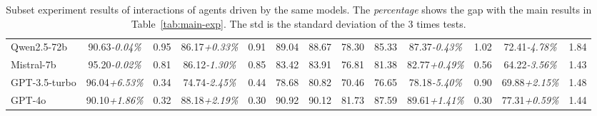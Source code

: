 \begin{table}
{\begin{tabular}{@{}lcccccccccccc@{}}
        Qwen2.5-72b & 90.63\textit{\small-0.04\%} & 0.95 & 86.17\textit{\small+0.33\%} & 0.91 & 89.04 & 88.67 & 78.30 & 85.33 & 87.37\textit{\small-0.43\%} & 1.02 & 72.41\textit{\small-4.78\%} & 1.84 \\
        Mistral-7b & 95.20\textit{\small-0.02\%} & 0.81 & 86.12\textit{\small-1.30\%} & 0.85 & 83.42 & 83.91 & 76.81 & 81.38 & 82.77\textit{\small+0.49\%} & 0.56 & 64.22\textit{\small-3.56\%} & 1.43 \\
        GPT-3.5-turbo & 96.04\textit{\small+6.53\%} & 0.34 & 74.74\textit{\small-2.45\%} & 0.44 & 78.68 & 80.82 & 70.46 & 76.65 & 78.18\textit{\small-5.40\%} & 0.90 & 69.88\textit{\small+2.15\%} & 1.48 \\
        GPT-4o & 90.10\textit{\small+1.86\%} & 0.32 & 88.18\textit{\small+2.19\%} & 0.30 & 90.92 & 90.12 & 81.73 & 87.59 & 89.61\textit{\small+1.41\%} & 0.30 & 77.31\textit{\small+0.59\%} & 1.44 \\ \bottomrule[1.1pt]
    \end{tabular}
    }
    \caption{Subset experiment results of interactions of agents driven by the same models. The \textit{percentage} shows the gap with the main results in Table~\ref{tab:main-exp}. The std is the standard deviation of the 3 times tests.}\label{tab:subset exp}
\end{table}